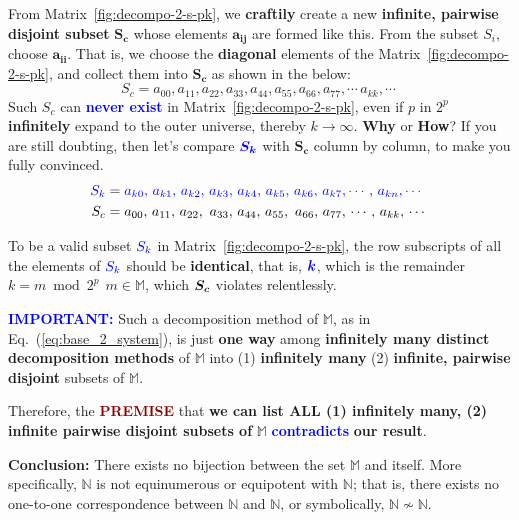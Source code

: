 \documentclass[12pt]{article}
\theoremstyle{definition} %
\numberwithin{equation}{section}
\newcommand{\eqrefc}[1]{Eq.~(\ref{eq:#1})}
\newcommand{\darkboldred}[1]			   
{\textbf{\textcolor{darkred}{#1}}}
\newcommand{\boldblu}[1]			    {\textbf{\textcolor{blue}{#1}}}
\newcommand{\boldcolormath}[2]
{\(\bm{\textcolor{#1}{#2}}\)}
\newcommand{\colormath}[2]
{\(\textcolor{#1}{#2}\)}
\begin{document}
\noindent From Matrix~\ref{fig:decompo-2-s-pk}, we \textbf{craftily} create a new \textbf{infinite, pairwise disjoint subset} \(\bm{S_c}\) whose elements \(\bm{a_{ij}}\) are formed like this. From the subset \(S_i\), choose \(\bm{a_{ii}}\). That is, we choose the \textbf{diagonal} elements of the Matrix~\ref{fig:decompo-2-s-pk}, and collect them into \(\bm{S_c}\) as shown in the below:
\[
	S_c = a_{00}, a_{11}, a_{22}, a_{33}
	,a_{44}, a_{55}, a_{66}, a_{77}, \cdots\, a_{kk}, \cdots\
\]
Such \(S_c\) can \boldblu{never exist} in Matrix~\ref{fig:decompo-2-s-pk}, even if \(p\) in \(2^p\) \textbf{infinitely} expand to the outer universe, thereby \(k \to \infty\). \textbf{Why} or \textbf{How}? If you are still doubting, then let's compare \boldcolormath{blue}{S_k} with \(\bm{S_c}\) column by column, to make you fully convinced.
\begin{align*}
\textcolor{blue}{S_k} 
&=\textcolor{blue}{a_{k0},\,a_{k1},\,a_{k2},\,a_{k3},\,a_{k4},\,a_{k5},\,a_{k6},\,a_{k7},
 \cdots,\,a_{kn},\cdots} \\
S_c &=
\textcolor{black}{a_{00},\,a_{11},\,a_{22},\,\,a_{33},\,a_{44},\,a_{55},\,\,a_{66},\,a_{77},\,\cdots,\,a_{kk},\,\cdots}\
\end{align*}
 
To be a valid subset \colormath{blue}{S_k} in Matrix~\ref{fig:decompo-2-s-pk}, the row  subscripts of all the elements of \colormath{blue}{S_k} should be \textbf{identical}, that is, \boldcolormath{blue}{k}, which is the remainder \(k = m\bmod 2^p\,\; m\in \mathbb{M}\), which \boldcolormath{black}{S_c} violates relentlessly.

\vspace{1em}
\noindent \boldblu{IMPORTANT:} Such a decomposition method of \(\mathbb{M}\), as in \eqrefc{base_2_system}, is just \textbf{one way} among \textbf{infinitely many distinct  decomposition methods} of \(\mathbb{M}\) into (1) \textbf{infinitely many} (2) \textbf{infinite, pairwise disjoint} subsets of \(\mathbb{M}\).

\vspace{1em}
Therefore, the \darkboldred{PREMISE} that \textbf{we can list ALL (1) infinitely many, (2) infinite pairwise disjoint subsets of} \(\mathbb{M}\) \boldblu{contradicts} \textbf{our result}. 

\vspace{1em}
\textbf{Conclusion:} There exists no bijection between the set \( \mathbb{M} \) and itself. More specifically, \( \mathbb{N} \) is not equinumerous or equipotent with \( \mathbb{N} \); that is, there exists no one-to-one correspondence between \( \mathbb{N} \) and \( \mathbb{N} \), or symbolically, \( \mathbb{N} \not\sim \mathbb{N} \).
\end{document}
